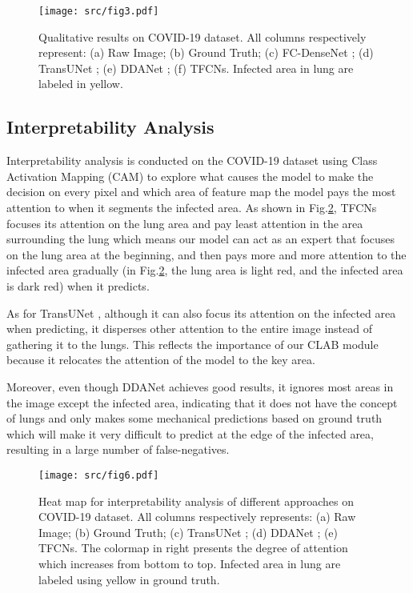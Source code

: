 \documentclass[runningheads]{llncs}
\begin{document}
\vspace{-5mm}
\begin{figure}[H]
\centerline{\texttt{[image: src/fig3.pdf]}}
\vspace{-2mm}
\caption{Qualitative results on COVID-19 dataset. All columns respectively represent: (a) Raw Image; (b) Ground Truth; (c) FC-DenseNet \cite{zhang2018automatic}; (d) TransUNet \cite{chen2021transunet}; (e) DDANet \cite{tomar2020ddanet}; (f) TFCNs. Infected area in lung are labeled in yellow.}
\label{fig5}
\end{figure}



\subsection{Interpretability Analysis}
\label{sec4.3}

Interpretability analysis is conducted on the COVID-19 dataset using Class Activation Mapping (CAM) \cite{zhou2016learning} to explore what causes the model to make the decision on every pixel and which area of feature map the model pays the most attention to when it segments the infected area. As shown in Fig.\ref{fig6}, TFCNs focuses its attention on the lung area and pay least attention in the area surrounding the lung which means our model can act as an expert that focuses on the lung area at the beginning, and then pays more and more attention to the infected area gradually (in Fig.\ref{fig6}, the lung area is light red, and the infected area is dark red) when it predicts.

As for TransUNet \cite{chen2021transunet}, although it can also focus its attention on the infected area when predicting, it disperses other attention to the entire image instead of gathering it to the lungs. This reflects the importance of our CLAB module because it relocates the attention of the model to the key area.

Moreover, even though DDANet \cite{tomar2020ddanet} achieves good results, it ignores most areas in the image except the infected area, indicating that it does not have the concept of lungs and only makes some mechanical predictions based on ground truth which will make it very difficult to predict at the edge of the infected area, resulting in a large number of false-negatives.

\begin{figure}[H]
\centerline{\texttt{[image: src/fig6.pdf]}}
\caption{Heat map for interpretability analysis of different approaches on COVID-19 dataset. All columns respectively represents: (a) Raw Image; (b) Ground Truth; (c) TransUNet \cite{chen2021transunet}; (d) DDANet \cite{tomar2020ddanet}; (e) TFCNs. The colormap in right presents the degree of attention which increases from bottom to top. Infected area in lung are labeled using yellow in ground truth.}
\label{fig6}
\end{figure}
\end{document}
